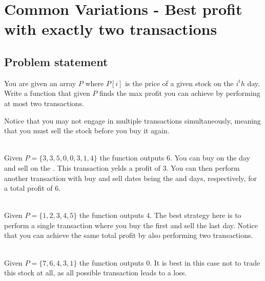\section{Common Variations - Best profit with exactly two transactions}
\label{sec:buy_sell_stocks3:intro}

\subsection{Problem statement}
\begin{exercise}
    You are given an array $P$ where $P[i]$ is the price of a given stock on the $i^th$ day.
    Write a function that given $P$ finds the max profit you can achieve by performing at most two transactions.
        
    Notice that you may not engage in multiple transactions simultaneously, meaning that you must sell the stock before you buy it again.
    
     
    \begin{example}
    \label{ex:buy_sell_stocks_3:exmaple1}
        \hfill \\
        Given $P=\{3,3,5,0,0,3,1,4\}$ the function outputs $6$. 
        You can buy on the  day and sell on the . This transaction yelds a profit of $3$.
        You can then perform another transaction with buy and sell dates being the  and  days, respectively, for a total profit of $6$.
    \end{example}

    \begin{example}
        \label{ex:buy_sell_stocks_3:exmaple2}
            \hfill \\
            Given $P=\{1,2,3,4,5\}$ the function outputs $4$. 
            The best strategy here is to perform a single transaction where you buy the first and sell the last day. Notice that you can achieve the same total profit by also performing two transactions.
    \end{example}

    \begin{example}
        \label{ex:buy_sell_stocks_3:exmaple3}
            \hfill \\
            Given $P=\{7,6,4,3,1\}$ the function outputs $0$. 
            It is best in this case not to trade this stock at all, as all possible transaction leads to a loss.
    \end{example}
\end{exercise}



